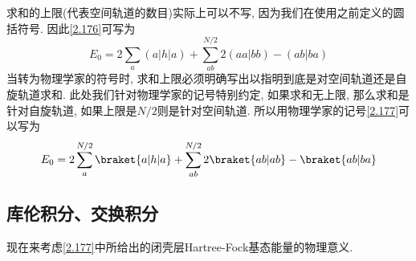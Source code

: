 求和的上限(代表空间轨道的数目)实际上可以不写, 
因为我们在使用之前定义的圆括符号. 
因此\autoref{2.176}可写为
\begin{equation}
\label{2.177}
E_0 = 2 \sum_{a}({a|h|a}) + \sum_{ab}^{N/2}2({aa|bb}) - ({ab|ba})
\end{equation}
当转为物理学家的符号时, 
求和上限必须明确写出以指明到底是对空间轨道还是自旋轨道求和. 
此处我们针对物理学家的记号特别约定, 
如果求和无上限, 
那么求和是针对自旋轨道, 
如果上限是$N/2$则是针对空间轨道. 
所以用物理学家的记号\autoref{2.177}可以写为
\begin{equation}
E_0 = 2 \sum_{a}^{N/2}\braket{a|h|a} + \sum_{ab}^{N/2}2\braket{ab|ab} - \braket{ab|ba}
\end{equation}

\subsection{库伦积分、交换积分}
\label{sec2.3.6}
现在来考虑\autoref{2.177}中所给出的闭壳层Hartree-Fock基态能量的物理意义.

